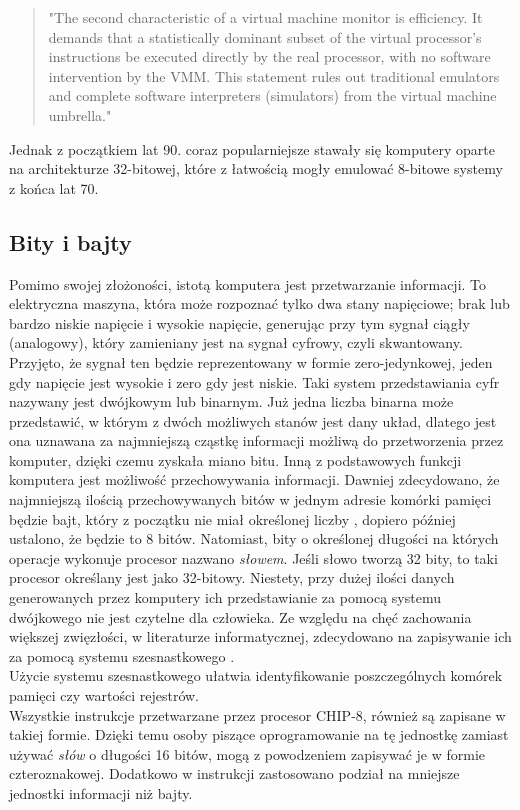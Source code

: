 \begin{quotation}
"The second characteristic of a virtual machine monitor is efficiency. It demands that a statistically dominant subset of the virtual processor's instructions be executed directly by the real processor, with no software intervention by the VMM. This statement rules out traditional emulators and complete software interpreters (simulators) from the virtual machine umbrella."
\end{quotation}
Jednak z początkiem lat 90. coraz popularniejsze stawały się komputery oparte na architekturze 32-bitowej, które z łatwością mogły emulować 8-bitowe systemy z końca lat 70.

\subsection{Bity i bajty}
Pomimo swojej złożoności, istotą komputera jest przetwarzanie informacji. To elektryczna maszyna, która może rozpoznać tylko dwa stany napięciowe; brak lub bardzo niskie napięcie i wysokie napięcie, generując przy tym sygnał ciągły (analogowy), który zamieniany jest na sygnał cyfrowy, czyli skwantowany. Przyjęto, że sygnał ten będzie reprezentowany w formie zero-jedynkowej, jeden gdy napięcie jest wysokie i zero gdy jest niskie. Taki system przedstawiania cyfr nazywany jest dwójkowym lub binarnym. Już jedna liczba binarna może przedstawić, w którym z dwóch możliwych stanów jest dany układ, dlatego jest ona uznawana za najmniejszą cząstkę informacji możliwą do przetworzenia przez komputer, dzięki czemu zyskała miano bitu. Inną z podstawowych funkcji komputera jest możliwość przechowywania informacji. Dawniej zdecydowano, że najmniejszą ilością przechowywanych bitów  w jednym adresie komórki pamięci będzie bajt, który z początku nie miał określonej liczby \cite{Petzold}, dopiero później ustalono, że będzie to 8 bitów. Natomiast, bity o określonej długości na których operacje wykonuje procesor nazwano \textit{słowem}. Jeśli słowo tworzą 32 bity, to taki procesor określany jest jako 32-bitowy. Niestety, przy dużej ilości danych generowanych przez komputery ich przedstawianie za pomocą systemu dwójkowego nie jest czytelne dla człowieka. Ze względu na chęć zachowania większej zwięzłości, w literaturze informatycznej, zdecydowano na zapisywanie ich za pomocą systemu szesnastkowego \cite{Petzold}. \\

Użycie systemu szesnastkowego ułatwia identyfikowanie poszczególnych komórek pamięci czy wartości rejestrów. \\Wszystkie instrukcje przetwarzane przez procesor CHIP-8, również są zapisane w takiej formie. Dzięki temu osoby piszące oprogramowanie na tę jednostkę zamiast używać \textit{słów} o długości 16 bitów, mogą z powodzeniem zapisywać je w formie czteroznakowej. Dodatkowo w instrukcji \cite{COSMAC} zastosowano podział na mniejsze jednostki informacji niż bajty. \\

